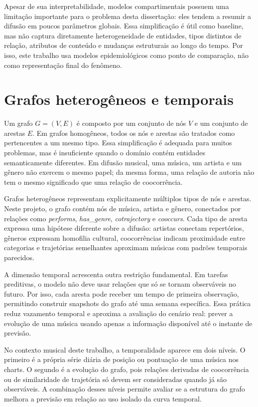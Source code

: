 Apesar de sua interpretabilidade, modelos compartimentais possuem uma limitação importante para o problema desta dissertação: eles tendem a resumir a difusão em poucos parâmetros globais. Essa simplificação é útil como baseline, mas não captura diretamente heterogeneidade de entidades, tipos distintos de relação, atributos de conteúdo e mudanças estruturais ao longo do tempo. Por isso, este trabalho usa modelos epidemiológicos como ponto de comparação, não como representação final do fenômeno.


\section{Grafos heterogêneos e temporais}

Um grafo $G = (V, E)$ é composto por um conjunto de nós $V$ e um conjunto de arestas $E$. Em grafos homogêneos, todos os nós e arestas são tratados como pertencentes a um mesmo tipo. Essa simplificação é adequada para muitos problemas, mas é insuficiente quando o domínio contém entidades semanticamente diferentes. Em difusão musical, uma música, um artista e um gênero não exercem o mesmo papel; da mesma forma, uma relação de autoria não tem o mesmo significado que uma relação de coocorrência.

Grafos heterogêneos representam explicitamente múltiplos tipos de nós e arestas. Neste projeto, o grafo contém nós de música, artista e gênero, conectados por relações como \emph{performs}, \emph{has\_genre}, \emph{cotrajectory} e \emph{cooccurs}. Cada tipo de aresta expressa uma hipótese diferente sobre a difusão: artistas conectam repertórios, gêneros expressam homofilia cultural, coocorrências indicam proximidade entre categorias e trajetórias semelhantes aproximam músicas com padrões temporais parecidos.

A dimensão temporal acrescenta outra restrição fundamental. Em tarefas preditivas, o modelo não deve usar relações que só se tornam observáveis no futuro. Por isso, cada aresta pode receber um tempo de primeira observação, permitindo construir snapshots do grafo até uma semana específica. Essa prática reduz vazamento temporal e aproxima a avaliação do cenário real: prever a evolução de uma música usando apenas a informação disponível até o instante de previsão.

No contexto musical deste trabalho, a temporalidade aparece em dois níveis. O primeiro é a própria série diária de posição ou pontuação de uma música nos charts. O segundo é a evolução do grafo, pois relações derivadas de coocorrência ou de similaridade de trajetória só devem ser consideradas quando já são observáveis. A combinação desses níveis permite avaliar se a estrutura do grafo melhora a previsão em relação ao uso isolado da curva temporal.

